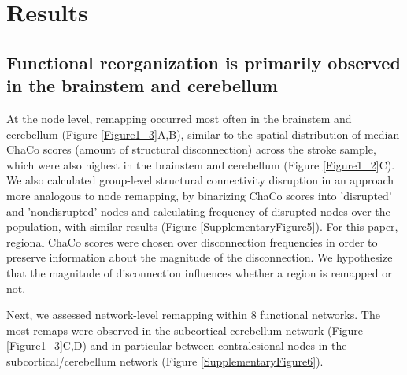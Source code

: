 \documentclass[phd,tocprelim]{cornell}
\begin{document}
	
\section{Results}
	\subsection{Functional reorganization is primarily observed in the brainstem and cerebellum}
	At the node level, remapping occurred most often in the brainstem and cerebellum (Figure \ref{Figure1_3}A,B), similar to the spatial distribution of median ChaCo scores (amount of structural disconnection) across the stroke sample, which were also highest in the brainstem and cerebellum (Figure \ref{Figure1_2}C). We also calculated group-level structural connectivity disruption in an approach more analogous to node remapping, by binarizing ChaCo scores into 'disrupted' and 'nondisrupted' nodes and calculating frequency of disrupted nodes over the population, with similar results (Figure \ref{SupplementaryFigure5}). For this paper, regional ChaCo scores were chosen over disconnection frequencies in order to preserve information about the magnitude of the disconnection. We hypothesize that the magnitude of disconnection influences whether a region is remapped or not.
	
	Next, we assessed network-level remapping within 8 functional networks. The most remaps were observed in the subcortical-cerebellum network (Figure \ref{Figure1_3}C,D) and in particular between contralesional nodes in the subcortical/cerebellum network (Figure \ref{SupplementaryFigure6}).
	
\end{document}

